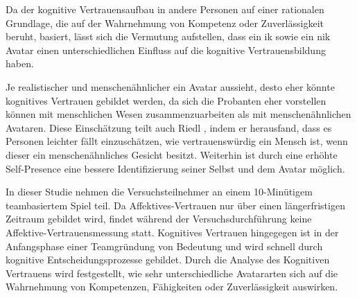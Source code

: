\documentclass[a4paper,11pt]{article}%
\renewcommand{\\}{\vspace*{0.5\baselineskip} \newline}
\begin{document}

Da der kognitive Vertrauensaufbau in andere Personen auf einer rationalen Grundlage, die auf der Wahrnehmung von Kompetenz oder Zuverlässigkeit beruht, basiert, lässt sich die Vermutung aufstellen, dass ein \ac{ik} sowie ein \ac{nik} Avatar einen unterschiedlichen Einfluss auf die kognitive Vertrauensbildung haben.

Je realistischer und menschenähnlicher ein Avatar aussieht, desto eher könnte kognitives Vertrauen gebildet werden, da sich die Probanten eher vorstellen können mit menschlichen Wesen zusammenzuarbeiten als mit menschenähnlichen Avataren. Diese Einschätzung teilt auch Riedl \cite{riedl2014trusting}, indem er herausfand, dass es Personen leichter fällt einzuschätzen, wie vertrauenswürdig ein Mensch ist, wenn dieser ein menschenähnliches Gesicht besitzt.
Weiterhin ist durch eine erhöhte Self-Presence eine bessere Identifizierung seiner Selbst und dem Avatar möglich. 

In dieser Studie nehmen die Versuchsteilnehmer an einem 10-Minütigem teambasiertem Spiel teil. Da Affektives-Vertrauen nur über einen längerfristigen Zeitraum gebildet wird, findet während der Versuchsdurchführung keine Affektive-Vertrauensmessung statt. 
Kognitives Vertrauen hingegegen ist in der Anfangsphase einer Teamgründung von Bedeutung und wird schnell durch kognitive Entscheidungsprozesse gebildet. Durch die Analyse des Kognitiven Vertrauens wird festgestellt, wie sehr unterschiedliche Avatararten sich auf die Wahrnehmung von Kompetenzen, Fähigkeiten oder Zuverlässigkeit auswirken.
\end{document}
